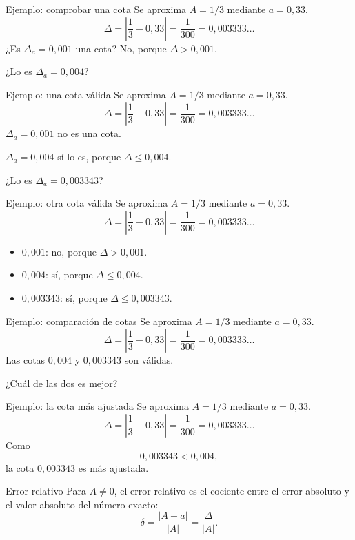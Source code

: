 \documentclass[original_version/main.tex]{subfiles}
\begin{document}
\begin{frame}{Ejemplo: comprobar una cota}
Se aproxima $A=1/3$ mediante $a=0{,}33$.\[\Delta=\left|\frac13-0{,}33\right|=\frac1{300}=0{,}003333\ldots\]¿Es $\Delta_a=0{,}001$ una cota? No, porque $\Delta>0{,}001$.\par\medskip ¿Lo es $\Delta_a=0{,}004$?
\end{frame}

\begin{frame}{Ejemplo: una cota válida}
Se aproxima $A=1/3$ mediante $a=0{,}33$.\[\Delta=\left|\frac13-0{,}33\right|=\frac1{300}=0{,}003333\ldots\]$\Delta_a=0{,}001$ no es una cota.\par\medskip $\Delta_a=0{,}004$ sí lo es, porque $\Delta\le0{,}004$.\par\medskip ¿Lo es $\Delta_a=0{,}003343$?
\end{frame}

\begin{frame}{Ejemplo: otra cota válida}
Se aproxima $A=1/3$ mediante $a=0{,}33$.\[\Delta=\left|\frac13-0{,}33\right|=\frac1{300}=0{,}003333\ldots\]\begin{itemize}\item $0{,}001$: no, porque $\Delta>0{,}001$.\item $0{,}004$: sí, porque $\Delta\le0{,}004$.\item $0{,}003343$: sí, porque $\Delta\le0{,}003343$.\end{itemize}
\end{frame}

\begin{frame}{Ejemplo: comparación de cotas}
Se aproxima $A=1/3$ mediante $a=0{,}33$.\[\Delta=\left|\frac13-0{,}33\right|=\frac1{300}=0{,}003333\ldots\]Las cotas $0{,}004$ y $0{,}003343$ son válidas.\par\medskip ¿Cuál de las dos es mejor?
\end{frame}

\begin{frame}{Ejemplo: la cota más ajustada}
Se aproxima $A=1/3$ mediante $a=0{,}33$.\[\Delta=\left|\frac13-0{,}33\right|=\frac1{300}=0{,}003333\ldots\]Como\[0{,}003343<0{,}004,\]la cota $0{,}003343$ es más ajustada.
\end{frame}

\begin{frame}{Error relativo}
Para $A\ne0$, el error relativo es el cociente entre el error absoluto y el valor absoluto del número exacto:\[\boxed{\delta=\frac{|A-a|}{|A|}=\frac\Delta{|A|}.}\]
\end{frame}
\end{document}
